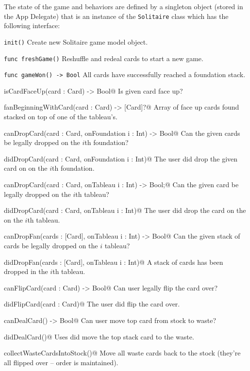 \documentclass[11pt]{article}
\begin{document}
The state of the game and behaviors are defined  by a singleton object
(stored in the App Delegate) that is an instance of the {\tt Solitaire}
class which has the following interface:
\begin{description}
\item{\tt init()} Create new Solitaire game model object.
\item{\tt func freshGame()} Reshuffle and redeal cards to start a new game. 
\item{\tt func gameWon() -> Bool} All cards have successfully reached a foundation stack. 
\item{\verb@func isCardFaceUp(card : Card) -> Bool@} Is given card face up? 
\item{\verb@func fanBeginningWithCard(card : Card) -> [Card]?@} Array of face up
   cards found stacked on top of one of the tableau's. 
\item{\verb@func canDropCard(card : Card, onFoundation i : Int) -> Bool@}  Can the given
  cards be legally dropped on the $i$th foundation?
\item{\verb@func didDropCard(card : Card, onFoundation i : Int)@} The user did drop
  the given card on on the $i$th foundation.
\item{\verb@func canDropCard(card : Card, onTableau i : Int) -> Bool;@} Can the given card
  be legally dropped on the $i$th tableau?
\item{\verb@func didDropCard(card : Card, onTableau i : Int)@} The user did drop
  the card on the on the $i$th tableau.
\item{\verb@func canDropFan(cards : [Card], onTableau i : Int) -> Bool@} Can the given 
  stack of cards be legally dropped on the $i$ tableau?
\item{\verb@func didDropFan(cards : [Card], onTableau i : Int)@} A stack of
  cards has been dropped in the $i$th tableau.
\item{\verb@func canFlipCard(card : Card) -> Bool@} Can user legally flip the card over?
\item{\verb@func didFlipCard(card : Card)@} The user did flip the card over.
\item{\verb@func canDealCard() -> Bool@} Can user move top card from stock to waste?
\item{\verb@func didDealCard()@} Uses did move the top stack card to the waste.
\item{\verb@func collectWasteCardsIntoStock()@} Move all waste cards back to
  the stock (they're all flipped over -- order is maintained).
\end{description}
\end{document}
